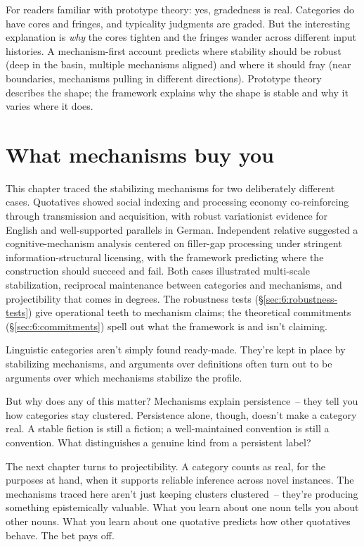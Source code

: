 For readers familiar with prototype theory: yes, gradedness is real. Categories do have cores and fringes, and typicality judgments are graded. But the interesting explanation is \emph{why} the cores tighten and the fringes wander across different input histories. A mechanism-first account predicts where stability should be robust (deep in the basin, multiple mechanisms aligned) and where it should fray (near boundaries, mechanisms pulling in different directions). Prototype theory describes the shape; the framework explains why the shape is stable and why it varies where it does.



\section{What mechanisms buy you}
\label{sec:6:what-mechanisms-buy}

This chapter traced the stabilizing mechanisms for two deliberately different cases. Quotatives showed social indexing and processing economy co-reinforcing through transmission and acquisition, with robust variationist evidence for English and well-supported parallels in German. Independent relative  suggested a cognitive-mechanism analysis centered on filler-gap processing under stringent information-structural licensing, with the framework predicting where the construction should succeed and fail. Both cases illustrated multi-scale stabilization, reciprocal maintenance between categories and mechanisms, and projectibility that comes in degrees. The robustness tests (§\ref{sec:6:robustness-tests}) give operational teeth to mechanism claims; the theoretical commitments (§\ref{sec:6:commitments}) spell out what the framework is and isn't claiming.

Linguistic categories aren't simply found ready-made. They're kept in place by stabilizing mechanisms, and arguments over definitions often turn out to be arguments over which mechanisms stabilize the profile.

But why does any of this matter? Mechanisms explain persistence~-- they tell you how categories stay clustered. Persistence alone, though, doesn't make a category real. A stable fiction is still a fiction; a well-maintained convention is still a convention. What distinguishes a genuine kind from a persistent label?

The next chapter turns to projectibility. A category counts as real, for the purposes at hand, when it supports reliable inference across novel instances. The mechanisms traced here aren't just keeping clusters clustered~-- they're producing something epistemically valuable. What you learn about one noun tells you about other nouns. What you learn about one quotative predicts how other quotatives behave. The bet pays off.

